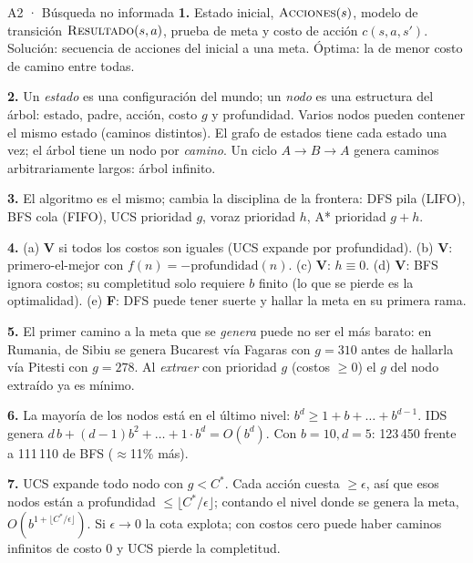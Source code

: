 \begin{solucion}{A2 · Búsqueda no informada}
\textbf{1.} Estado inicial, $\textsc{Acciones}(s)$, modelo de transición $\textsc{Resultado}(s,a)$,
prueba de meta y costo de acción $c(s,a,s')$. Solución: secuencia de acciones del inicial a una
meta. Óptima: la de menor costo de camino entre todas.

\textbf{2.} Un \emph{estado} es una configuración del mundo; un \emph{nodo} es una estructura del
árbol: estado, padre, acción, costo $g$ y profundidad. Varios nodos pueden contener el mismo estado
(caminos distintos). El grafo de estados tiene cada estado una vez; el árbol tiene un nodo por
\emph{camino}. Un ciclo $A\to B\to A$ genera caminos arbitrariamente largos: árbol infinito.

\textbf{3.} El algoritmo es el mismo; cambia la disciplina de la frontera: DFS pila (LIFO), BFS cola
(FIFO), UCS prioridad $g$, voraz prioridad $h$, A* prioridad $g+h$.

\textbf{4.} (a) \textbf{V} si todos los costos son iguales (UCS expande por profundidad). (b)
\textbf{V}: primero-el-mejor con $f(n)=-\text{profundidad}(n)$. (c) \textbf{V}: $h\equiv0$.
(d) \textbf{V}: BFS ignora costos; su completitud solo requiere $b$ finito (lo que se pierde es la
optimalidad). (e) \textbf{F}: DFS puede tener suerte y hallar la meta en su primera rama.

\textbf{5.} El primer camino a la meta que se \emph{genera} puede no ser el más barato: en Rumania,
de Sibiu se genera Bucarest vía Fagaras con $g=310$ antes de hallarla vía Pitesti con $g=278$. Al
\emph{extraer} con prioridad $g$ (costos $\ge0$) el $g$ del nodo extraído ya es mínimo.

\textbf{6.} La mayoría de los nodos está en el último nivel: $b^d\ge 1+b+\dots+b^{d-1}$. IDS genera
$d\,b+(d-1)b^2+\dots+1\cdot b^d=O(b^d)$. Con $b=10,d=5$: 123\,450 frente a 111\,110 de BFS ($\approx$11\% más).

\textbf{7.} UCS expande todo nodo con $g<C^*$. Cada acción cuesta $\ge\epsilon$, así que esos nodos
están a profundidad $\le\lfloor C^*/\epsilon\rfloor$; contando el nivel donde se genera la meta,
$O(b^{1+\lfloor C^*/\epsilon\rfloor})$. Si $\epsilon\to0$ la cota explota; con costos cero puede haber
caminos infinitos de costo 0 y UCS pierde la completitud.
\end{solucion}

